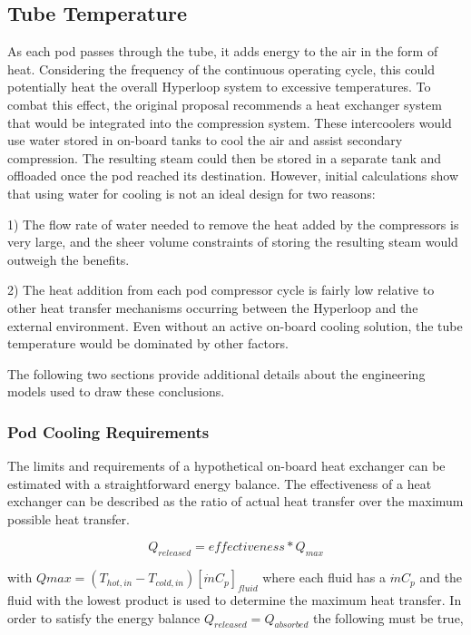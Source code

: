 \documentclass[heading.tex]{subfiles}
\begin{document}
\subsection{Tube Temperature}

As each pod passes through the tube, it adds energy to the air in the form of heat. Considering the frequency of the continuous operating cycle,
this could potentially heat the overall Hyperloop system to excessive temperatures.
To combat this effect, the original proposal recommends a heat exchanger system that would 
be integrated into the compression system. These intercoolers would use water stored in on-board tanks to cool the
air and assist secondary compression. The resulting steam could then be stored in a separate tank and offloaded once the pod reached its destination.
However, initial calculations show that using water for cooling is not an ideal design for two reasons:

1) The flow rate of water needed to remove the heat added by the compressors is very large, and the sheer volume constraints of storing
the resulting steam would outweigh the benefits.

2) The heat addition from each pod compressor cycle is fairly low relative to other heat transfer mechanisms occurring between the Hyperloop
and the external environment. Even without an active on-board cooling solution, the tube temperature would be dominated by other factors.

The following two sections provide additional details about the engineering models used to draw these conclusions.

\subsubsection{Pod Cooling Requirements}

The limits and requirements of a hypothetical on-board heat exchanger can be estimated with a straightforward energy balance. The
effectiveness of a heat exchanger can be described as the ratio of actual heat transfer over the maximum possible heat transfer.

\begin{equation*}
{Q}_{released}  = effectiveness * {Q}_{max}
\end{equation*}


with $Qmax=\left(T_{hot,in} - T_{cold,in}\right) [ \dot{m} C_{p} ]_{fluid}$ where each fluid has a $\dot{m} C_{p}$ and the fluid with the lowest
product is used to determine the maximum heat transfer. In order to satisfy the energy balance $Q_{released}=Q_{absorbed}$ the following must be true,
\end{document}
